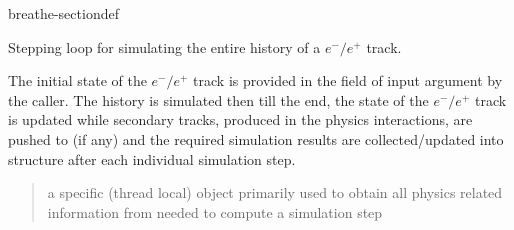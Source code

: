 \documentclass[letterpaper,10pt,english]{sphinxmanual}
\begin{document}
\begin{fulllineitems}
\begin{sphinxuseclass}{breathe-sectiondef}
\begin{fulllineitems}
\label{\detokenize{Simulation/SimulationCodeDoc:_CPPv4N12SteppingLoop15ElectronStepperER13G4HepEmTLDataR12G4HepEmStateR10TrackStackR8GeometryR7Resultsi}}
\pysigstartsignatures
\pysigstartmultiline
{}
\pysigstopmultiline
\pysigstopsignatures
\sphinxAtStartPar
Stepping loop for simulating the entire history of a \(e^-/e^+\) track. 

\sphinxAtStartPar
The initial state of the \(e^-/e^+\) track is provided in the  field of  input argument by the caller. The history is simulated then till the end, the state of the \(e^-/e^+\) track is updated while secondary tracks, produced in the physics interactions, are pushed to  (if any) and the required simulation results are collected/updated into  structure after each individual simulation step.

\sphinxAtStartPar
\begin{quote}\begin{description}
\sphinxAtStartPar
a  specific (thread local) object primarily used to obtain all physics related information from  needed to compute a simulation step 


\end{description}
\end{quote}
\end{fulllineitems}
\end{sphinxuseclass}
\end{fulllineitems}
\end{document}
